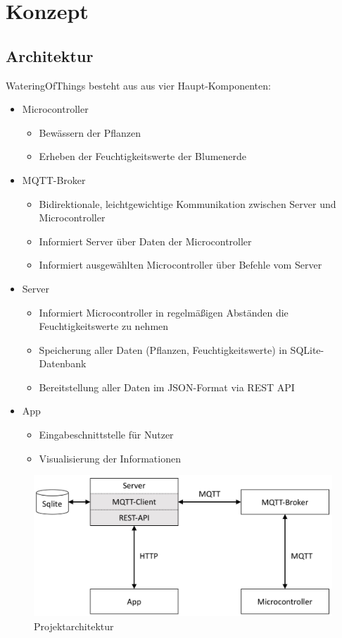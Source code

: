 \section{Konzept}
    \subsection{Architektur}
    WateringOfThings besteht aus aus vier Haupt-Komponenten: 
   \begin{itemize}
       \item Microcontroller
           \begin{itemize}
               \item Bewässern der Pflanzen
               \item Erheben der Feuchtigkeitswerte der Blumenerde
           \end{itemize}
       \item MQTT-Broker
           \begin{itemize}
               \item Bidirektionale, leichtgewichtige Kommunikation zwischen Server und Microcontroller
               \item Informiert Server über Daten der Microcontroller
               \item Informiert ausgewählten Microcontroller über Befehle vom Server
           \end{itemize}
       \item Server
           \begin{itemize}
               \item Informiert Microcontroller in regelmäßigen Abständen die Feuchtigkeitswerte zu nehmen
               \item Speicherung aller Daten (Pflanzen, Feuchtigkeitswerte) in SQLite-Datenbank
               \item Bereitstellung aller Daten im JSON-Format via REST API
           \end{itemize}
    \item App
        \begin{itemize}
            \item Eingabeschnittstelle für Nutzer
            \item Visualisierung der Informationen
        \end{itemize}
   \end{itemize}
    \begin{figure}[H]
        \centering
        \includegraphics[width=0.7\linewidth]{../Pictures/Konzept/Architecture}
        \caption{Projektarchitektur}
        \label{fig:architecture}
    \end{figure}
    
